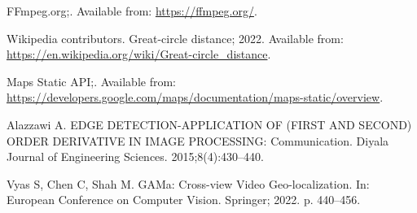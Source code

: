 \documentclass[10pt,letterpaper]{article}
\begin{document}
\begin{thebibliography}{10}
  FFmpeg.org;.
  \newblock Available from: \url{https://ffmpeg.org/}.
  
  {Wikipedia contributors}. Great-circle distance; 2022.
  \newblock Available from:
    \url{https://en.wikipedia.org/wiki/Great-circle_distance}.
  
  Maps Static API;.
  \newblock Available from:
    \url{https://developers.google.com/maps/documentation/maps-static/overview}.
  
  Alazzawi A.
  \newblock EDGE DETECTION-APPLICATION OF (FIRST AND SECOND) ORDER DERIVATIVE IN
    IMAGE PROCESSING: Communication.
  \newblock Diyala Journal of Engineering Sciences. 2015;8(4):430--440.

  Vyas S, Chen C, Shah M.
  \newblock GAMa: Cross-view Video Geo-localization.
  \newblock In: European Conference on Computer Vision.   Springer; 2022. p.
    440--456.
\end{thebibliography}
\end{document}
